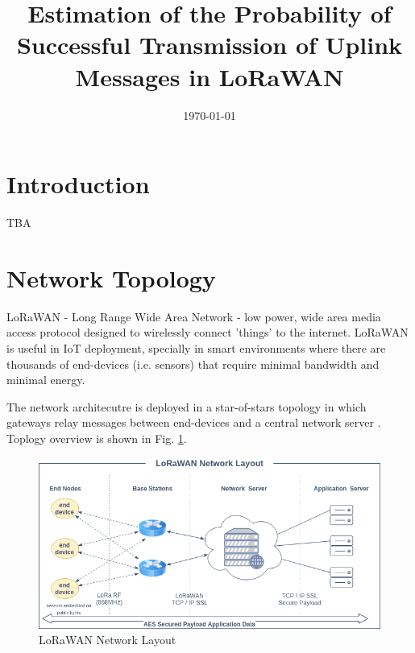 \documentclass[10pt, a4paper]{article} %
\title{Estimation of the Probability of Successful Transmission of Uplink Messages in LoRaWAN} %
\author{
	\authorstyle{Ante Lojić Kapetanović}
	\newline\newline %
	\institution{University of Split, Split, Croatia}
}
\date{\today} %
\begin{document}
\maketitle %

\thispagestyle{firstpage} %




\section{Introduction}
TBA

\section{Network Topology}

LoRaWAN - Long Range Wide Area Network - low power, wide area media access protocol designed to wirelessly connect 'things' to the internet. LoRaWAN is useful in IoT deployment, specially in smart environments where there are thousands of end-devices (i.e. sensors) that require minimal bandwidth and minimal energy.

The network architecutre is deployed in a star-of-stars topology in which gateways relay messages between end-devices and a central network server \cite{Silva_LoRaWAN}.
Toplogy overview is shown in Fig. \ref{lorawan}.
\begin{figure}
	\includegraphics[width=\linewidth]{images/LoRaWAN-Network-Layout.png} %
	\caption{LoRaWAN Network Layout} %
	\label{lorawan} %
\end{figure}
\end{document}
